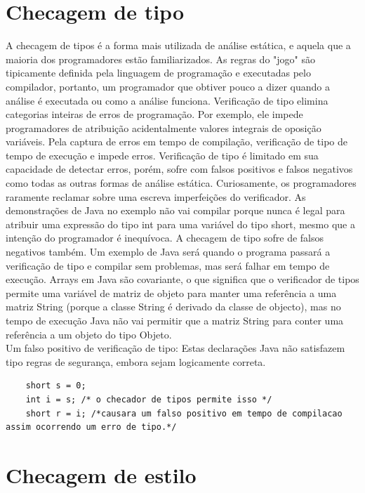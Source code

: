 	\section {Checagem de tipo}
	
	A checagem de tipos é a forma mais utilizada de análise estática, e aquela que a maioria dos programadores estão familiarizados. As regras do "jogo" são tipicamente definida pela linguagem de programação e executadas pelo compilador, portanto, um programador que obtiver pouco a dizer quando a análise é executada ou como a análise funciona. Verificação de tipo elimina categorias inteiras de erros de programação. Por exemplo, ele impede programadores de atribuição acidentalmente valores integrais de oposição variáveis. Pela captura de erros em tempo de compilação, verificação de tipo de tempo de execução e impede erros. Verificação de tipo é limitado em sua capacidade de detectar erros, porém, sofre com falsos positivos e falsos negativos como todas as outras formas de análise estática. Curiosamente, os programadores raramente reclamar sobre uma escreva imperfeições do verificador. As demonstrações de Java no exemplo não vai compilar porque nunca é legal para atribuir uma expressão do tipo int para uma variável do tipo short, mesmo que a intenção do programador é inequívoca. A checagem de tipo sofre de falsos negativos também. Um exemplo de Java será quando o programa passará a verificação de tipo e compilar sem problemas, mas será falhar em tempo de execução. Arrays em Java são covariante, o que significa que o verificador de tipos permite uma variável de matriz de objeto para manter uma referência a uma matriz String (porque a classe String é derivado da classe de objecto), mas no tempo de execução Java não vai permitir que a matriz String para conter uma referência a um objeto do tipo Objeto.\\
	
	Um falso positivo de verificação de tipo: Estas declarações Java não satisfazem tipo regras de segurança, embora sejam logicamente correta.\\
	\begin{lstlisting}
	short s = 0;
	int i = s; /* o checador de tipos permite isso */
	short r = i; /*causara um falso positivo em tempo de compilacao assim ocorrendo um erro de tipo.*/
	\end{lstlisting}

	\section {Checagem de estilo}
	
